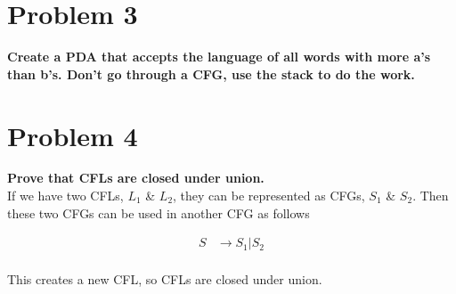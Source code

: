 \documentclass{scrbook}
\begin{document}
\section*{Problem 3} \textbf{Create a PDA that accepts the language of all
  words with more a's than b's. Don't go through a CFG, use the stack to do the
  work.}

  \begin{figure}[H]
  \end{figure}


\newpage
\section*{Problem 4} \textbf{Prove that CFLs are closed under union.}\\
If we have two CFLs, $L_1$ & $L_2$, they can be represented as CFGs,
$S_1$ & $S_2$.  Then these two CFGs can be used in another CFG as follows

  \begin{align*}
    S &\rightarrow S_1 | S_2 \\
  \end{align*}

This creates a new CFL, so CFLs are closed under union.
\end{document}
